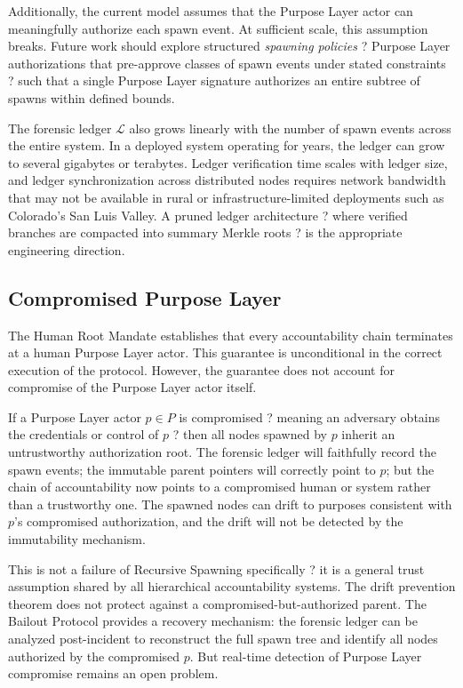Additionally, the current model assumes that the Purpose Layer actor can meaningfully authorize each spawn event. At sufficient scale, this assumption breaks. Future work should explore structured \textit{spawning policies} ? Purpose Layer authorizations that pre-approve classes of spawn events under stated constraints ? such that a single Purpose Layer signature authorizes an entire subtree of spawns within defined bounds.

The forensic ledger $\mathcal{L}$ also grows linearly with the number of spawn events across the entire system. In a deployed system operating for years, the ledger can grow to several gigabytes or terabytes. Ledger verification time scales with ledger size, and ledger synchronization across distributed nodes requires network bandwidth that may not be available in rural or infrastructure-limited deployments such as Colorado's San Luis Valley. A pruned ledger architecture ? where verified branches are compacted into summary Merkle roots ? is the appropriate engineering direction.

\subsection{Compromised Purpose Layer}
\label{sec:lim-purpose}

The Human Root Mandate establishes that every accountability chain terminates at a human Purpose Layer actor. This guarantee is unconditional in the correct execution of the protocol. However, the guarantee does not account for compromise of the Purpose Layer actor itself.

If a Purpose Layer actor $p \in P$ is compromised ? meaning an adversary obtains the credentials or control of $p$ ? then all nodes spawned by $p$ inherit an untrustworthy authorization root. The forensic ledger will faithfully record the spawn events; the immutable parent pointers will correctly point to $p$; but the chain of accountability now points to a compromised human or system rather than a trustworthy one. The spawned nodes can drift to purposes consistent with $p$'s compromised authorization, and the drift will not be detected by the immutability mechanism.

This is not a failure of Recursive Spawning specifically ? it is a general trust assumption shared by all hierarchical accountability systems. The drift prevention theorem does not protect against a compromised-but-authorized parent. The Bailout Protocol provides a recovery mechanism: the forensic ledger can be analyzed post-incident to reconstruct the full spawn tree and identify all nodes authorized by the compromised $p$. But real-time detection of Purpose Layer compromise remains an open problem.

